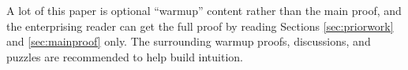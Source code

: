 \documentclass{theoretics}
\begin{document}
A lot of this paper is optional ``warmup'' content rather than the main proof, and the enterprising reader can get the full proof by reading Sections \ref{sec:priorwork} and \ref{sec:mainproof} only.
The surrounding warmup proofs, discussions, and puzzles are recommended to help build intuition.










\end{document}
